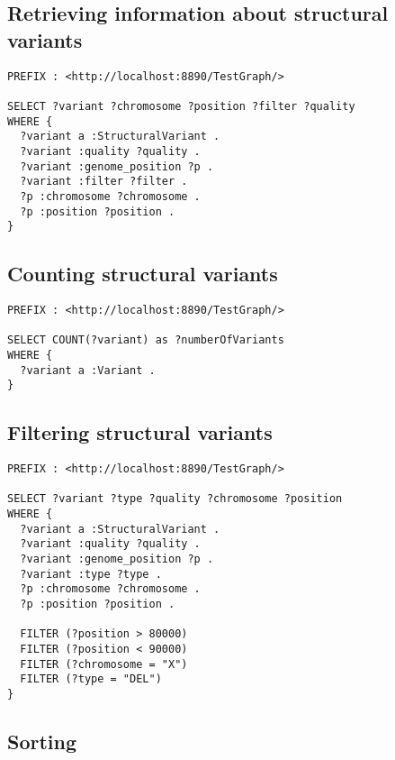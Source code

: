\documentclass[11pt,a4paper,oneside]{book}
\begin{document}
\subsection{Retrieving information about structural variants}
\label{sec:sparqling-svs}

\begin{siderules}
\begin{verbatim}
PREFIX : <http://localhost:8890/TestGraph/>

SELECT ?variant ?chromosome ?position ?filter ?quality
WHERE {
  ?variant a :StructuralVariant .
  ?variant :quality ?quality .
  ?variant :genome_position ?p .
  ?variant :filter ?filter .
  ?p :chromosome ?chromosome .
  ?p :position ?position .
}
\end{verbatim}
\end{siderules}

\subsection{Counting structural variants}

\begin{siderules}
\begin{verbatim}
PREFIX : <http://localhost:8890/TestGraph/>

SELECT COUNT(?variant) as ?numberOfVariants
WHERE {
  ?variant a :Variant .
}
\end{verbatim}
\end{siderules}

\subsection{Filtering structural variants}

\begin{siderules}
\begin{verbatim}
PREFIX : <http://localhost:8890/TestGraph/>

SELECT ?variant ?type ?quality ?chromosome ?position
WHERE {
  ?variant a :StructuralVariant .
  ?variant :quality ?quality .
  ?variant :genome_position ?p .
  ?variant :type ?type .
  ?p :chromosome ?chromosome .
  ?p :position ?position .

  FILTER (?position > 80000)
  FILTER (?position < 90000)
  FILTER (?chromosome = "X")
  FILTER (?type = "DEL")
}
\end{verbatim}
\end{siderules}

\subsection{Sorting}
\end{document}
